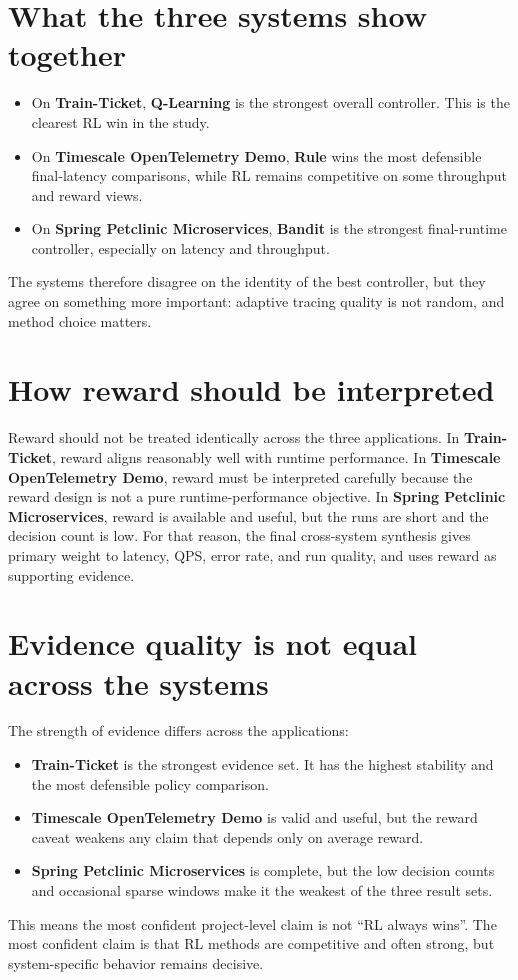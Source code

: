 \documentclass[11pt]{report}
\newcommand{\QL}{\textbf{Q-Learning}}
\newcommand{\Bandit}{\textbf{Bandit}}
\newcommand{\Rule}{\textbf{Rule}}
\newcommand{\TT}{\textbf{Train-Ticket}}
\newcommand{\TS}{\textbf{Timescale OpenTelemetry Demo}}
\newcommand{\SP}{\textbf{Spring Petclinic Microservices}}
\begin{document}
\section{What the three systems show together}
\begin{itemize}
    \item On \TT{}, \QL{} is the strongest overall controller. This is the clearest RL win in the study.
    \item On \TS{}, \Rule{} wins the most defensible final-latency comparisons, while RL remains competitive on some throughput and reward views.
    \item On \SP{}, \Bandit{} is the strongest final-runtime controller, especially on latency and throughput.
\end{itemize}
The systems therefore disagree on the identity of the best controller, but they agree on something more important: adaptive tracing quality is not random, and method choice matters.

\section{How reward should be interpreted}
Reward should not be treated identically across the three applications. In \TT{}, reward aligns reasonably well with runtime performance. In \TS{}, reward must be interpreted carefully because the reward design is not a pure runtime-performance objective. In \SP{}, reward is available and useful, but the runs are short and the decision count is low. For that reason, the final cross-system synthesis gives primary weight to latency, QPS, error rate, and run quality, and uses reward as supporting evidence.

\section{Evidence quality is not equal across the systems}
The strength of evidence differs across the applications:
\begin{itemize}
    \item \TT{} is the strongest evidence set. It has the highest stability and the most defensible policy comparison.
    \item \TS{} is valid and useful, but the reward caveat weakens any claim that depends only on average reward.
    \item \SP{} is complete, but the low decision counts and occasional sparse windows make it the weakest of the three result sets.
\end{itemize}
This means the most confident project-level claim is not ``RL always wins''. The most confident claim is that RL methods are competitive and often strong, but system-specific behavior remains decisive.
\end{document}
